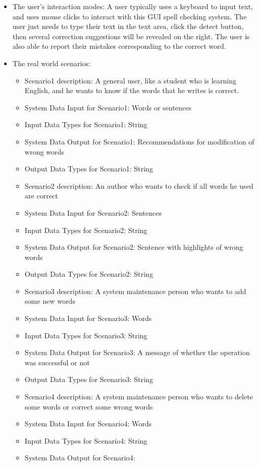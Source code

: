 \begin{itemize}
\item{The user's interaction modes: }
A user typically uses a keyboard to input text, and uses mouse clicks to interact with this GUI spell checking system. The user just needs to type their text in the text area, click the detect button, then several correction suggestions will be revealed on the right. The user is also able to report their mistakes corresponding to the correct word.
\item{The real world scenarios: }
	\begin{itemize} 
	\item{Scenario1 description: }
	A general user, like a student who is learning English, and he wants to know if the words that he writes is correct.
	\item{System Data Input for Scenario1: }
	Words or sentences
	\item{Input Data Types for Scenario1: }
	String
	\item{System Data Output for Scenario1: }
	Recommendations for modification of wrong words
	\item{Output Data Types for Scenario1: }
	String
	\item{Scenario2 description: }
	An author who wants to check if all words he used are correct 
	\item{System Data Input for Scenario2: }
	Sentences 
	\item{Input Data Types for Scenario2: }
	String
	\item{System Data Output for Scenario2: }
	Sentence with highlights of wrong words
	\item{Output Data Types for Scenario2: }
	String
	\item{Scenario3 description: }
	A system maintenance person who wants to add some new words
	\item{System Data Input for Scenario3: }
	Words  
	\item{Input Data Types for Scenario3: }
	String
	\item{System Data Output for Scenario3: }
	A message of whether the operation was successful or not
	\item{Output Data Types for Scenario3: }
	String
	\item{Scenario4 description: }
	A system maintenance person who wants to delete some words or correct some wrong words
	\item{System Data Input for Scenario4: }
	Words  
	\item{Input Data Types for Scenario4: }
	String
	\item{System Data Output for Scenario4: }

\end{itemize}
\end{itemize}
